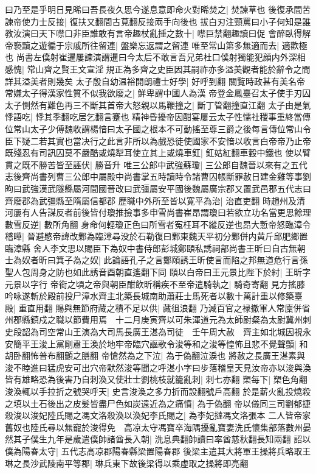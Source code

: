 曰乃至是乎明日見晞曰吾長夜久思今遂息意即命火對晞焚之|{
	焚諫草也}
後復承間苦諫帝使力士反接|{
	復扶又翻間古莧翻反接兩手向後也}
拔白刃注頸罵曰小子何知是誰教汝演曰天下噤口非臣誰敢有言帝趣杖亂捶之數十|{
	噤巨禁翻趣讀曰促}
會醉臥得解帝䙝黷之遊徧于宗戚所往留連|{
	盤樂忘返謂之留連}
唯至常山第多無適而去|{
	適歡極也}
尚書左僕射崔暹屢諫演謂暹曰今太后不敢言吾兄弟杜口僕射獨能犯顔内外深相感愧|{
	常山齊之賢王文宣淫規正為多齊之史臣因其嗣祚亦多溢美觀者能於辭令之間詳其溢美者則幾矣}
太子殷自幼温裕開朗禮士好學|{
	好呼到翻}
關覽時政甚有美名帝常嫌太子得漢家性質不似我欲廢之|{
	鮮卑謂中國人為漢}
帝登金鳳臺召太子使手刃囚太子惻然有難色再三不斷其首帝大怒親以馬鞭撞之|{
	斷丁管翻撞直江翻}
太子由是氣悸語吃|{
	悸其季翻吃居乞翻言蹇也}
精神昏擾帝因酣宴屢云太子性懦社稷事重終當傳位常山太子少傅魏收謂楊愔曰太子國之根本不可動搖至尊三爵之後每言傳位常山令臣下疑二若其實也當决行之此言非所以為戲恐徒使國家不安愔以收言白帝帝乃止帝既殘忍有司訊囚莫不嚴酷或燒犁耳使立其上或燒車釭|{
	釭姑紅翻車轂中鐵也}
使以臂貫之既不勝苦皆至誣伏|{
	勝音升}
唯三公郎中武強蘇瓊|{
	三公郎自魏晉以來有之五代志後齊尚書列曹三公郎中屬殿中尚書掌五時讀時令諸曹囚帳斷罪赦日建金雞等事劉昫曰武強漢武隧縣屬河間國晉改曰武彊屬安平國後魏屬廣宗郡又置武邑郡五代志曰齊廢郡為武彊縣至隋屬信都郡}
歷職中外所至皆以寛平為治|{
	治直吏翻}
時趙州及清河屢有人告謀反者前後皆付瓊推撿事多申雪尚書崔昂謂瓊曰若欲立功名當更思餘理數雪反逆|{
	數所角翻}
身命何輕瓊正色曰所雪者寃枉耳不縱反逆也昂大慙帝怒臨漳令稽曄|{
	晉避愍帝諱改鄴為臨漳尋没於石勒復曰鄴東魏天平初分鄴併内黄斤邱肥鄉置臨漳縣}
舍人李文思以賜臣下為奴中書侍郎彭城鄭頤私誘祠部尚書王昕曰自古無朝士為奴者昕曰箕子為之奴|{
	此論語孔子之言鄭頤誘王昕使言而陷之邦無道危行言孫聖人包周身之防也如此誘音酉朝直遙翻下同}
頤以白帝曰王元景比陛下於紂|{
	王昕字元景以字行}
帝銜之頃之帝與朝臣酣飲昕稱疾不至帝遣騎執之|{
	騎奇寄翻}
見方搖膝吟咏遂斬於殿前投尸漳水齊主北築長城南助蕭莊士馬死者以數十萬計重以修築臺殿|{
	重直用翻}
賜與無節府藏之積不足以供|{
	藏徂浪翻}
乃減百官之禄撤軍人常廩併省州郡縣鎮戍之職以節費用焉　十二月庚寅齊以可朱渾道元為太師尉粲為太尉冀州刺史段韶為司空常山王演為大司馬長廣王湛為司徒　壬午周大赦　齊主如北城因視永安簡平王浚上黨剛肅王渙於地牢帝臨穴謳歌令浚等和之浚等惶怖且悲不覺聲顫|{
	和胡卧翻怖普布翻顫之膳翻}
帝愴然為之下泣|{
	為于偽翻泣淚也}
將赦之長廣王湛素與浚不睦進曰猛虎安可出穴帝默然浚等聞之呼湛小字曰步落稽皇天見汝帝亦以浚與渙皆有雄略恐為後害乃自刺渙又使壯士劉桃枝就籠亂刺|{
	刺七亦翻}
槊每下|{
	槊色角翻}
浚渙輒以手拉折之號哭呼天|{
	史言浚渙之多力折而設翻號戶高翻}
於是薪火亂投燒殺之填以土石後出之皮髮皆盡尸色如炭遠近為之痛憤|{
	為于偽翻}
帝以儀同三司劉郁捷殺浚以浚妃陸氏賜之馮文洛殺渙以渙妃李氏賜之|{
	為李妃撻馮文洛張本}
二人皆帝家舊奴也陸氏尋以無寵於浚得免　高凉太守馮寶卒海隅擾亂寶妻洗氏懷集部落數州晏然其子僕生九年是歲遣僕帥諸酋長入朝|{
	洗息典翻帥讀曰率酋慈秋翻長知兩翻}
詔以僕為陽春太守|{
	五代志高凉郡陽春縣梁置陽春郡}
後梁主遣其大將軍王操將兵略取王琳之長沙武陵南平等郡|{
	琳兵東下故後梁得以乘虛取之操將即亮翻}


